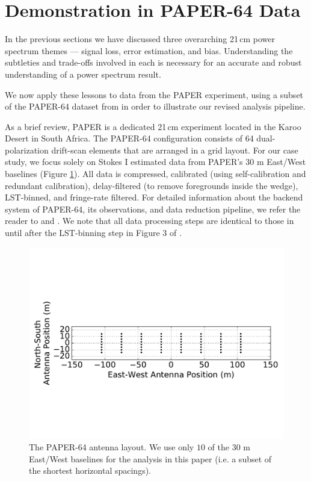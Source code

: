 \documentclass[preprint2,numberedappendix,tighten]{aastex6}  %
\begin{document}

\section{Demonstration in PAPER-64 Data}
\label{sec:CaseStudy}

In the previous sections we have discussed three overarching 21\,cm power spectrum themes --- signal loss, error estimation, 
and bias. Understanding the subtleties and trade-offs involved in each is necessary for an accurate and robust understanding of 
a power spectrum result. 

We now apply these lessons to data from the PAPER experiment, using a subset of the PAPER-64 dataset from
 in order to illustrate our revised analysis pipeline.

As a brief review, PAPER is a dedicated 21\,cm experiment located in the Karoo Desert in South Africa. The PAPER-64 
configuration consists of 64 dual-polarization drift-scan elements that are arranged in a grid layout. For our case study, we 
focus solely on Stokes I estimated data \citep{moore_et_al2013} from PAPER's $30$ m East/West baselines (Figure 
\ref{fig:ant_layout}). All data is compressed, calibrated (using self-calibration and redundant calibration), delay-filtered (to remove foregrounds inside the wedge), LST-binned, and fringe-rate filtered. For detailed information about the backend system of PAPER-64, its observations, and data reduction pipeline, we 
refer the reader to \citet{parsons_et_al2010} and . We note that all data processing steps are identical to those in  until after the LST-binning step in Figure 3 of .

\begin{figure}
	\centering
	\includegraphics[trim={0cm 3cm 0cm 3cm},width=\columnwidth]{plots/ant_layout_aspect.pdf}
	\caption{The PAPER-64 antenna layout. We use only $10$ of the $30$ m East/West baselines for the analysis in this 
paper (i.e. a subset of the shortest horizontal spacings).}
	\label{fig:ant_layout}
\end{figure}
\end{document}
